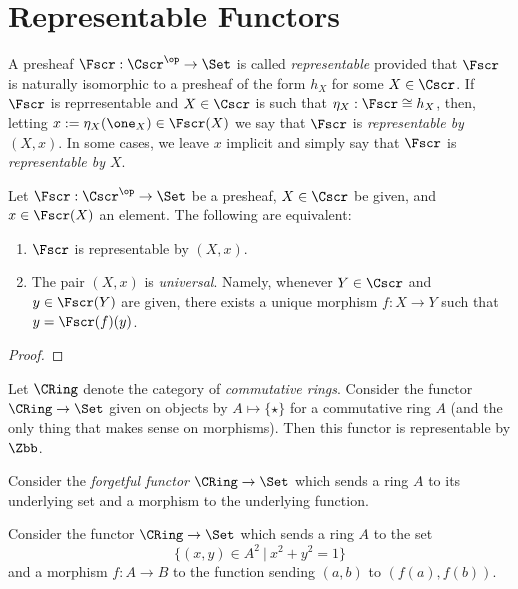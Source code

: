 \section{Representable Functors}

A presheaf $\Fscr : \Cscr^\op \to \Set$ is called \emph{representable} provided that $\Fscr$ is naturally isomorphic to a presheaf of the form $h_{X}$ for some $X \in \Cscr$.
If $\Fscr$ is reprresentable and $X \in \Cscr$ is such that $\eta_{X} : \Fscr \cong h_{X}$, then, letting $x := \eta_{X}(\one_{X}) \in \Fscr(X)$ we say that $\Fscr$ is \emph{representable by $(X,x)$}.
In some cases, we leave $x$ implicit and simply say that $\Fscr$ is \emph{representable by $X$}.

\begin{theorem}
  Let $\Fscr : \Cscr^{\op} \to \Set$ be a presheaf, $X \in \Cscr$ be given, and $x \in \Fscr(X)$ an element.
  The following are equivalent:
  \begin{enumerate}
    \item $\Fscr$ is representable by $(X,x)$.
    \item The pair $(X,x)$ is \emph{universal}.
          Namely, whenever $Y \in \Cscr$ and $y \in \Fscr(Y)$ are given, there exists a unique morphism $f : X \to Y$ such that $y = \Fscr(f)(y)$.
  \end{enumerate}
\end{theorem}
\begin{proof}
\end{proof}


\begin{example}
  Let $\CRing$ denote the category of \emph{commutative rings}.
  Consider the functor $\CRing \to \Set$ given on objects by $A \mapsto \{\star\}$ for a commutative ring $A$ (and the only thing that makes sense on morphisms).
  Then this functor is representable by $\Zbb$.
\end{example}

\begin{example}
  Consider the \emph{forgetful functor} $\CRing \to \Set$ which sends a ring $A$ to its underlying set and a morphism to the underlying function.
\end{example}

\begin{example}
  Consider the functor $\CRing \to \Set$ which sends a ring $A$ to the set
  \[ \{ (x,y) \in A^{2} \ | \ x^{2} + y^{2} = 1 \} \]
  and a morphism $f : A \to B$ to the function sending $(a,b)$ to $(f(a),f(b))$.
\end{example}

